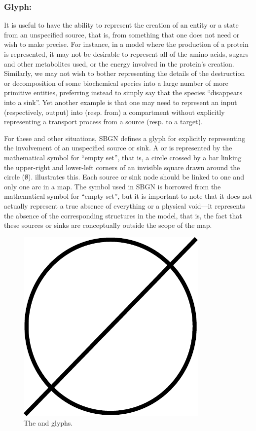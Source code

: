 \subsubsection{Glyph: }
\label{sec:sourceSink}

It is useful to have the ability to represent the creation of an entity or
a state from an unspecified source, that is, from something that one does
not need or wish to make precise.  For instance, in a model where the
production of a protein is represented, it may not be desirable to
represent all of the amino acids, sugars and other metabolites used, or the
energy involved in the protein's creation.  Similarly, we may not wish to
bother representing the details of the destruction or decomposition of some
biochemical species into a large number of more primitive entities,
preferring instead to simply say that the species ``disappears into a
sink''.  Yet another example is that one may need to represent an input
(respectively, output) into (resp. from) a compartment without explicitly
representing a transport process from a source (resp. to a target).

For these and other situations, SBGN defines a glyph for explicitly
representing the involvement of an unspecified source or sink. A  or  is represented by the mathematical symbol for ``empty
set'', that is, a circle crossed by a bar linking the upper-right and
lower-left corners of an invisible square drawn around the circle ($\emptyset$).
 illustrates this. Each source or sink node should be linked to one
and only one arc in a map. The symbol
used in SBGN is borrowed from the mathematical symbol for ``empty set'',
but it is important to note that it does not actually represent a true
absence of everything or a physical void---it represents the absence of the
corresponding structures in the model, that is, the fact that these sources
or sinks are conceptually outside the scope of the map. 

\begin{figure}[htb]
  \centering
  \includegraphics[scale = 0.3]{le_images/sourceSink}
  \caption{The  and  glyphs.}
  \label{fig:sourceSink}
\end{figure}


